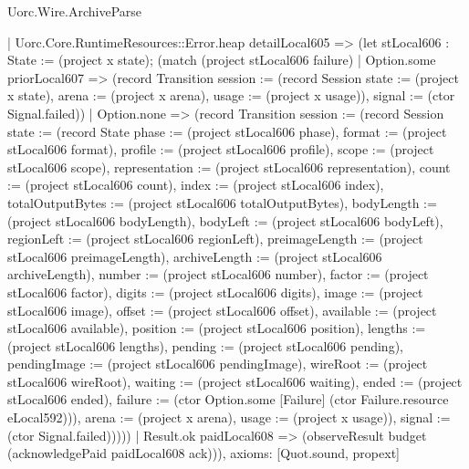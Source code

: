 \begin{lexlean}{Uorc.Wire.ArchiveParse}
\begin{semanticmodule}
{      | Uorc.Core.RuntimeResources::Error.heap detailLocal605 => (let stLocal606 : State := (project x state); (match (project stLocal606 failure)
        | Option.some priorLocal607 => (record Transition {session := (record Session {state := (project x state), arena := (project x arena), usage := (project x usage)}), signal := (ctor Signal.failed)})
        | Option.none => (record Transition {session := (record Session {state := (record State {phase := (project stLocal606 phase), format := (project stLocal606 format), profile := (project stLocal606 profile), scope := (project stLocal606 scope), representation := (project stLocal606 representation), count := (project stLocal606 count), index := (project stLocal606 index), totalOutputBytes := (project stLocal606 totalOutputBytes), bodyLength := (project stLocal606 bodyLength), bodyLeft := (project stLocal606 bodyLeft), regionLeft := (project stLocal606 regionLeft), preimageLength := (project stLocal606 preimageLength), archiveLength := (project stLocal606 archiveLength), number := (project stLocal606 number), factor := (project stLocal606 factor), digits := (project stLocal606 digits), image := (project stLocal606 image), offset := (project stLocal606 offset), available := (project stLocal606 available), position := (project stLocal606 position), lengths := (project stLocal606 lengths), pending := (project stLocal606 pending), pendingImage := (project stLocal606 pendingImage), wireRoot := (project stLocal606 wireRoot), waiting := (project stLocal606 waiting), ended := (project stLocal606 ended), failure := (ctor Option.some [Failure] (ctor Failure.resource eLocal592))}), arena := (project x arena), usage := (project x usage)}), signal := (ctor Signal.failed)}))))
    | Result.ok paidLocal608 => (observeResult budget (acknowledgePaid paidLocal608 ack))),
  axioms: [Quot.sound, propext]
}


\end{semanticmodule}
\end{lexlean}
